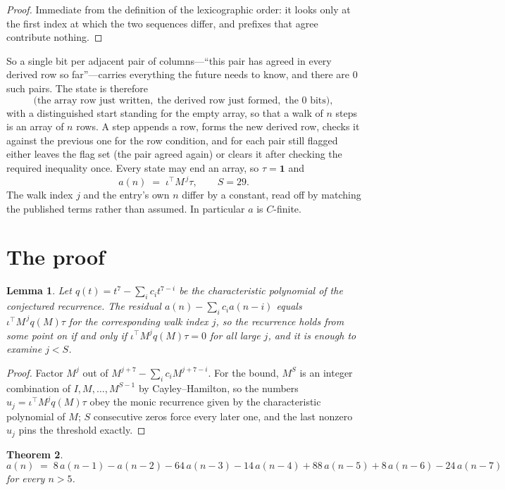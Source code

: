 \documentclass[11pt,a4paper]{article}
\theoremstyle{plain}
\newtheorem{theorem}{Theorem}
\newtheorem{lemma}[theorem]{Lemma}
\theoremstyle{definition}
\begin{document}
\begin{proof}
Immediate from the definition of the lexicographic order: it looks only at the first index at
which the two sequences differ, and prefixes that agree contribute nothing.
\end{proof}

So a single bit per adjacent pair of columns---``this pair has agreed in every derived row so
far''---carries everything the future needs to know, and there are $0$ such pairs. The state
is therefore
\[
\bigl(\text{the array row just written},\; \text{the derived row just formed},\;
\text{the 0 bits}\bigr),
\]
with a distinguished start standing for the empty array, so that a walk of $n$ steps is an array
of $n$ rows. A step appends a row, forms the new derived row, checks it against the previous one
for the row condition, and for each pair still flagged either leaves the flag set (the pair
agreed again) or clears it after checking the required inequality once. Every state may end an
array, so $\tau=\mathbf{1}$ and
\[
a(n)\;=\;\iota^{\!\top}M^{\,j}\tau ,\qquad S=29.
\]
The walk index $j$ and the entry's own $n$ differ by a constant, read off by matching the
published terms rather than assumed. In particular $a$ is $C$-finite.

\section{The proof}

\begin{lemma}\label{lem:crit}
Let $q(t)=t^{7}-\sum_i c_it^{7-i}$ be the characteristic polynomial of the
conjectured recurrence. The residual $a(n)-\sum_ic_ia(n-i)$ equals
$\iota^{\!\top}M^{\,j}q(M)\tau$ for the corresponding walk index $j$, so the recurrence
holds from some point on if and only if $\iota^{\!\top}M^{j}q(M)\tau=0$ for all large $j$,
and it is enough to examine $j<S$.
\end{lemma}

\begin{proof}
Factor $M^{j}$ out of $M^{j+7}-\sum_ic_iM^{j+7-i}$. For the bound, $M^{S}$
is an integer combination of $I,M,\dots,M^{S-1}$ by Cayley--Hamilton, so the numbers
$u_j=\iota^{\!\top}M^{j}q(M)\tau$ obey the monic recurrence given by the characteristic
polynomial of $M$; $S$ consecutive zeros force every later one, and the last nonzero $u_j$
pins the threshold exactly.
\end{proof}

\begin{theorem}
\[
a(n)\;=\;8\,a(n-1) - a(n-2) - 64\,a(n-3) - 14\,a(n-4) + 88\,a(n-5) + 8\,a(n-6) - 24\,a(n-7)
\]
for every $n>5$.
\end{theorem}
\end{document}
